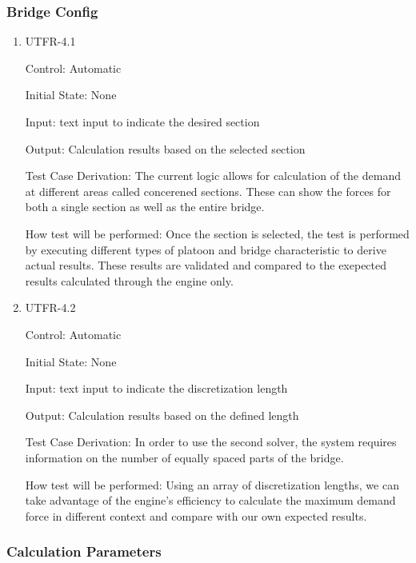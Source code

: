 \documentclass[12pt, titlepage]{article}
\begin{document}
\subsubsection{Bridge Config}

\begin{enumerate}

\item{UTFR-4.1\\}

Control: Automatic
					
Initial State: None
					
Input: text input to indicate the desired section 
					
Output: Calculation results based on the selected section

Test Case Derivation: The current logic allows for calculation of the demand at different areas called concerened sections. These can show the forces for both a single section as well as the entire bridge. 

How test will be performed: Once the section is selected, the test is performed by executing different types of platoon and bridge characteristic to derive actual results. These results are validated and compared to the exepected results calculated through the engine only. 
					
\item{UTFR-4.2\\}

Control: Automatic
					
Initial State: None
					
Input: text input to indicate the discretization length 
					
Output: Calculation results based on the defined length

Test Case Derivation: In order to use the second solver, the system requires information on the number of equally spaced parts of the bridge. 

How test will be performed: Using an array of discretization lengths, we can take advantage of the engine's efficiency to calculate the maximum demand force in different context and compare with our own expected results. 

\end{enumerate}


\subsubsection{Calculation Parameters}
\end{document}
